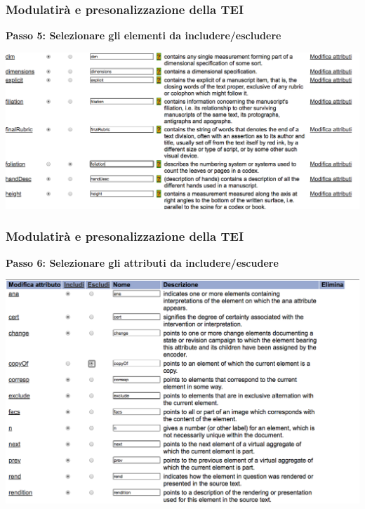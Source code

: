\begin{frame}
    \frametitle{Modulatirà e presonalizzazione della TEI}
    \addtocounter{nframe}{1}
    
    
    \textbf{Passo 5: Selezionare gli elementi da includere/escludere}

     \begin{center}
        \includegraphics[width=.95\textwidth]{imgs/Roma6.png}
     \end{center}
   
    
\end{frame}

\begin{frame}
    \frametitle{Modulatirà e presonalizzazione della TEI}
    \addtocounter{nframe}{1}
    
    \textbf{Passo 6: Selezionare gli attributi da includere/escudere}

     \begin{center}
        \includegraphics[width=.9\textwidth]{imgs/Roma7.png}
     \end{center}
   
    
\end{frame}

